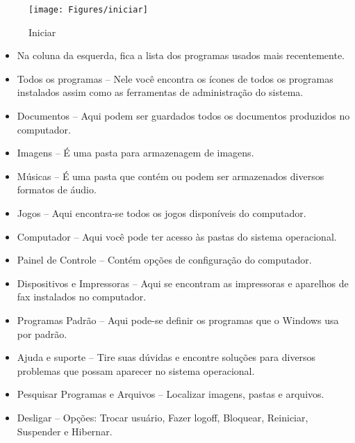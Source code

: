 \documentclass[hidelinks,12pt]{article}
\begin{document}
	
	\begin{figure}[!h]
		\centering
		\texttt{[image: Figures/iniciar]}
		\caption{Iniciar}
		\label{fig:iniciar}
		
	\end{figure}
	\newpage
	\begin{itemize}
	\item Na coluna da esquerda, fica a lista dos programas usados mais recentemente.

	\item Todos os programas – Nele você encontra os ícones de todos os programas instalados assim como as ferramentas de administração do sistema.
	
	\item Documentos – Aqui podem ser guardados todos os documentos produzidos no computador.
	
	\item Imagens – É uma pasta para armazenagem de imagens.
	
	\item Músicas – É uma pasta que contém ou podem ser armazenados diversos formatos de áudio.
	
	\item Jogos – Aqui encontra-se todos os jogos disponíveis do computador.
	
	\item Computador – Aqui você pode ter acesso às pastas do sistema operacional.
	
	\item Painel de Controle – Contém opções de configuração do computador.
	
	\item Dispositivos e Impressoras – Aqui se encontram as impressoras e aparelhos de fax instalados no computador.
	
	\item Programas Padrão – Aqui pode-se definir os programas que o Windows usa por padrão.
	
	\item Ajuda e suporte – Tire suas dúvidas e encontre soluções para diversos problemas que possam aparecer no sistema operacional.
	
	\item Pesquisar Programas e Arquivos – Localizar imagens, pastas e arquivos.
	
	\item Desligar – Opções: Trocar usuário, Fazer logoff, Bloquear, Reiniciar, Suspender e Hibernar.
	\end{itemize}
	
\end{document}
